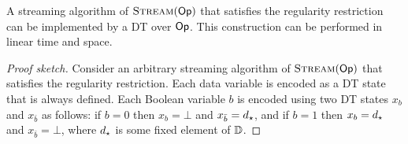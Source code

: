 \begin{theorem}
A streaming algorithm of $\textsc{Stream}(\textsf{Op})$ that satisfies the regularity restriction can be implemented by a DT over $\textsf{Op}$. This construction can be performed in linear time and space.
\end{theorem}
\begin{proof}[Proof sketch]
Consider an arbitrary streaming algorithm of $\textsc{Stream}(\textsf{Op})$ that satisfies the regularity restriction. Each data variable is encoded as a DT state that is always defined. Each Boolean variable $b$ is encoded using two DT states $x_b$ and $x_{\bar b}$ as follows: if $b = 0$ then $x_b = \bot$ and $x_{\bar b} = d_\star$, and if $b = 1$ then $x_b = d_\star$ and $x_{\bar b} = \bot$, where $d_\star$ is some fixed element of $\mathbb{D}$.
\end{proof}
